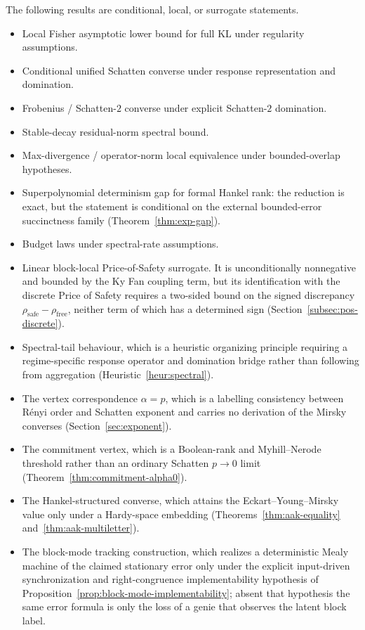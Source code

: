 \documentclass[12pt]{article}
\theoremstyle{definition}
\begin{document}
The following results are conditional, local, or surrogate statements.

\begin{itemize}[leftmargin=1.6em]
\item Local Fisher asymptotic lower bound for full KL under regularity
assumptions.
\item Conditional unified Schatten converse under response representation and
domination.
\item Frobenius / Schatten-$2$ converse under explicit Schatten-$2$
domination.
\item Stable-decay residual-norm spectral bound.
\item Max-divergence / operator-norm local equivalence under bounded-overlap
hypotheses.
\item Superpolynomial determinism gap for formal Hankel rank: the reduction is
exact, but the statement is conditional on the external bounded-error
succinctness family (Theorem~\ref{thm:exp-gap}).
\item Budget laws under spectral-rate assumptions.
\item Linear block-local Price-of-Safety surrogate.  It is unconditionally
nonnegative and bounded by the Ky Fan coupling term, but its identification
with the discrete Price of Safety requires a two-sided bound on the signed
discrepancy $\rho_{\mathrm{safe}}-\rho_{\mathrm{free}}$, neither term of which
has a determined sign (Section~\ref{subsec:pos-discrete}).
\item Spectral-tail behaviour, which is a heuristic organizing principle
requiring a regime-specific response operator and domination bridge rather
than following from aggregation
(Heuristic~\ref{heur:spectral}).
\item The vertex correspondence $\alpha=p$, which is a labelling consistency
between R\'enyi order and Schatten exponent and carries no derivation of the
Mirsky converses (Section~\ref{sec:exponent}).
\item The commitment vertex, which is a Boolean-rank and Myhill--Nerode
threshold rather than an ordinary Schatten $p\to0$ limit
(Theorem~\ref{thm:commitment-alpha0}).
\item The Hankel-structured converse, which attains the Eckart--Young--Mirsky
value only under a Hardy-space embedding
(Theorems~\ref{thm:aak-equality} and~\ref{thm:aak-multiletter}).
\item The block-mode tracking construction, which realizes a deterministic
Mealy machine of the claimed stationary error only under the explicit
input-driven synchronization and right-congruence implementability
hypothesis of Proposition~\ref{prop:block-mode-implementability}; absent that
hypothesis the same error formula is only the loss of a genie that observes
the latent block label.
\end{itemize}
\end{document}
